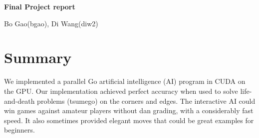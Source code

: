 \documentclass[11pt]{article}
\begin{document}
\linespread{1.5}
{\centering
{\huge \bfseries Final Project report \par}
\vspace{0.5cm}
{\Large Bo Gao(bgao), Di Wang(diw2) \par}}

\section*{Summary}
We implemented a parallel Go artificial intelligence (AI) program in CUDA on the GPU. Our implementation achieved perfect accuracy when used to solve life-and-death problems (tsumego) on the corners and edges. The interactive AI could win games against amateur players without dan grading, with a considerably fast speed. It also sometimes provided elegant moves that could be great examples for beginners.
\end{document}
